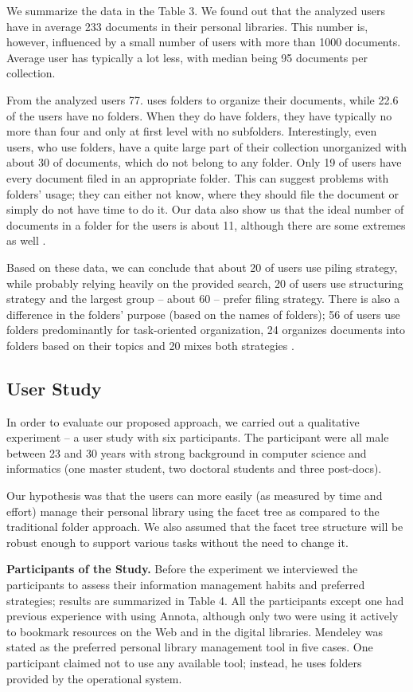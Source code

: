 \documentclass{article}
\begin{document}
  We summarize the data in the Table 3. We found out that the analyzed users have in average 233 documents in their personal libraries. This number is, however, influenced by a small number of users with more than 1000 documents. Average user has typically a lot less, with median being 95 documents per collection. 
 
 From the analyzed users 77.  uses folders to organize their documents, while 22.6 of the users have no folders. When they do have folders, they have typically no more than four and only at first level with no subfolders. Interestingly, even users, who use folders, have a quite large part of their collection unorganized with about 30 of documents, which do not belong to any folder. Only 19 of users have every document filed in an appropriate folder. This can suggest problems with folders’ usage; they can either not know, where they should file the document or simply do not have time to do it. Our data also show us that the ideal number of documents in a folder for the users is about 11, although there are some extremes as well .
 
 Based on these data, we can conclude that about 20 of users use piling strategy, while probably relying heavily on the provided search, 20 of users use structuring strategy and the largest group – about 60 – prefer filing strategy. There is also a difference in the folders’ purpose (based on the names of folders); 56 of users use folders predominantly for task-oriented organization, 24 organizes documents into folders based on their topics and 20 mixes both strategies  . 
 
 \subsection{User Study}
 In order to evaluate our proposed approach, we carried out a qualitative experiment – a user study with six participants. The participant were all male between 23 and 30 years with strong background in computer science and informatics (one master student, two doctoral students and three post-docs). 
 
 Our hypothesis was that the users can more easily (as measured by time and effort) manage their personal library using the facet tree as compared to the traditional folder approach. We also assumed that the facet tree structure will be robust enough to support various tasks without the need to change it.        
 
 
 \textbf{Participants of the Study.} Before the experiment we interviewed the participants to assess their information management habits and preferred strategies; results are summarized in Table 4. All the participants except one had previous experience with using Annota, although only two were using it actively to bookmark resources on the Web and in the digital libraries. Mendeley was stated as the preferred personal library management tool in five cases. One participant claimed not to use any available tool; instead, he uses folders provided by the operational system. 
 
\end{document}
